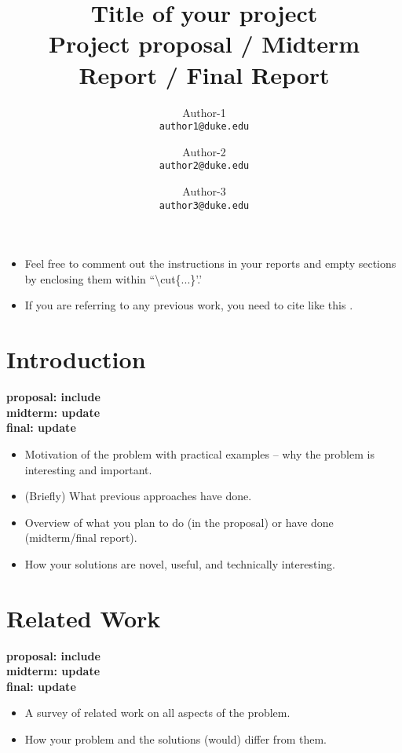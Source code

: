 \documentclass[twocolumn]{article}
\newcommand{\red}[1]{{\bf \color{red}#1}}
\newcommand{\blue}[1]{{\bf \color{blue}#1}}
\begin{document}
\title{Title of your project\\
\small{Project proposal / Midterm Report / Final Report}}

\author{Author-1 \\
\small \texttt{author1@duke.edu} \and 
Author-2 \\
\small \texttt{author2@duke.edu} \and 
Author-3 \\
\small \texttt{author3@duke.edu}}
\date{}
\maketitle
\blue{
\begin{itemize}
\item Feel free to comment out the instructions in your reports and empty sections by enclosing them within ``\textbackslash cut\{...\}'.'
\item If you are referring to any previous work, you need to cite like this \cite{cowbook}.
\end{itemize}
}
\section{Introduction}\label{sec:introduction}
\blue{
proposal: include\\
midterm: update\\
final: update\\
}

\red{
\begin{itemize}
\itemsep0em
\item Motivation of the problem with practical examples -- why the problem is interesting and important.
\item (Briefly) What previous approaches have done.
\item Overview of what you plan to do (in the proposal) or have done (midterm/final report).
\item How your solutions are novel, useful, and technically interesting.
\end{itemize}
}

\section{Related Work}
\blue{
proposal: include\\
midterm: update\\
final: update\\
}

\red{
\begin{itemize}
\itemsep0em
\item A survey of related work on all aspects of the problem.
\item How your problem and the solutions (would) differ from them.
\end{itemize}
}
\end{document}
